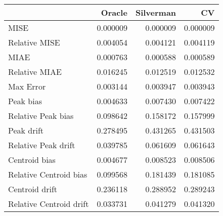\begin{tabular}{lrrr}
  \hline
 & Oracle & Silverman & CV \\ 
  \hline
MISE & 0.000009 & 0.000009 & 0.000009 \\ 
  Relative MISE & 0.004054 & 0.004121 & 0.004119 \\ 
  MIAE & 0.000763 & 0.000588 & 0.000589 \\ 
  Relative MIAE & 0.016245 & 0.012519 & 0.012532 \\ 
  Max Error & 0.003144 & 0.003947 & 0.003943 \\ 
  Peak bias & 0.004633 & 0.007430 & 0.007422 \\ 
  Relative Peak bias & 0.098642 & 0.158172 & 0.157999 \\ 
  Peak drift & 0.278495 & 0.431265 & 0.431503 \\ 
  Relative Peak drift & 0.039785 & 0.061609 & 0.061643 \\ 
  Centroid bias & 0.004677 & 0.008523 & 0.008506 \\ 
  Relative Centroid bias & 0.099568 & 0.181439 & 0.181085 \\ 
  Centroid drift & 0.236118 & 0.288952 & 0.289243 \\ 
  Relative Centroid drift & 0.033731 & 0.041279 & 0.041320 \\ 
   \hline
\end{tabular}
